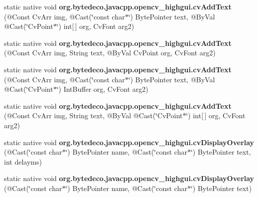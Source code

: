 \begin{DoxyCompactItemize}
\item 
\mbox{\label{group__highgui__c_ga2e03a33f876e3a86862f6d82ec9f73d1}} 
static native void {\bfseries org.\+bytedeco.\+javacpp.\+opencv\+\_\+highgui.\+cv\+Add\+Text} (@Const Cv\+Arr img, @Cast(\char`\"{}const char$\ast$\char`\"{}) Byte\+Pointer text, @By\+Val @Cast(\char`\"{}Cv\+Point$\ast$\char`\"{}) int\mbox{[}$\,$\mbox{]} org, Cv\+Font arg2)
\item 
\mbox{\label{group__highgui__c_ga654315abe250fde29f27380e0ea2b0fe}} 
static native void {\bfseries org.\+bytedeco.\+javacpp.\+opencv\+\_\+highgui.\+cv\+Add\+Text} (@Const Cv\+Arr img, String text, @By\+Val Cv\+Point org, Cv\+Font arg2)
\item 
\mbox{\label{group__highgui__c_gaa8f29faac1934fa37fd36236823a2c07}} 
static native void {\bfseries org.\+bytedeco.\+javacpp.\+opencv\+\_\+highgui.\+cv\+Add\+Text} (@Const Cv\+Arr img, @Cast(\char`\"{}const char$\ast$\char`\"{}) Byte\+Pointer text, @By\+Val @Cast(\char`\"{}Cv\+Point$\ast$\char`\"{}) Int\+Buffer org, Cv\+Font arg2)
\item 
\mbox{\label{group__highgui__c_gaa771a5036963826183dfc0ed7f3b0009}} 
static native void {\bfseries org.\+bytedeco.\+javacpp.\+opencv\+\_\+highgui.\+cv\+Add\+Text} (@Const Cv\+Arr img, String text, @By\+Val @Cast(\char`\"{}Cv\+Point$\ast$\char`\"{}) int\mbox{[}$\,$\mbox{]} org, Cv\+Font arg2)
\item 
\mbox{\label{group__highgui__c_ga3831a8dd35141deebe970c3ec33f0a62}} 
static native void {\bfseries org.\+bytedeco.\+javacpp.\+opencv\+\_\+highgui.\+cv\+Display\+Overlay} (@Cast(\char`\"{}const char$\ast$\char`\"{}) Byte\+Pointer name, @Cast(\char`\"{}const char$\ast$\char`\"{}) Byte\+Pointer text, int delayms)
\item 
\mbox{\label{group__highgui__c_ga2f793c73559e4ae5fdc015de839110ab}} 
static native void {\bfseries org.\+bytedeco.\+javacpp.\+opencv\+\_\+highgui.\+cv\+Display\+Overlay} (@Cast(\char`\"{}const char$\ast$\char`\"{}) Byte\+Pointer name, @Cast(\char`\"{}const char$\ast$\char`\"{}) Byte\+Pointer text)
\item 
\mbox{\label{group__highgui__c_ga0bcf160db70e69d8f716b78eb9a768bb}} 

\end{DoxyCompactItemize}
